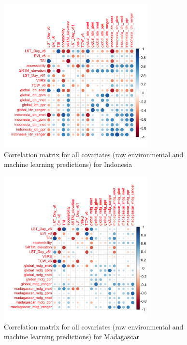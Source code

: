 \documentclass[review]{elsarticle}
\begin{document}
\begin{figure}[h!]
  \centering
  \includegraphics[width=0.7\textwidth]{figs/SI/idn_correlation_plot.png}
\caption{
  Correlation matrix for all covariates (raw environmental and machine learning predictions) for Indonesia}

\end{figure}


\begin{figure}[h!]
  \centering
  \includegraphics[width=0.7\textwidth]{figs/SI/mdg_correlation_plot.png}
\caption{
  Correlation matrix for all covariates (raw environmental and machine learning predictions) for Madagascar}

\end{figure}
\end{document}
